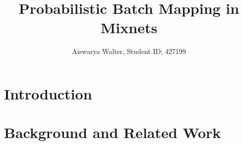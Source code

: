 \documentclass[twocolumn]{article}
\title{Probabilistic Batch Mapping in Mixnets}
\author{Aiswarya Walter, Student ID: 427199}
\date{}
\begin{document}
\maketitle

\begin{abstract}
\end{abstract}


\section{Introduction}



\section{Background and Related Work}
\label{sec:bg}

\end{document}
